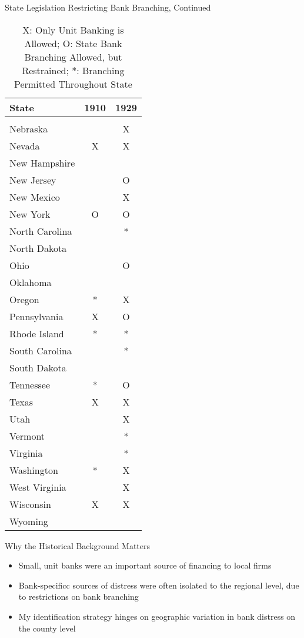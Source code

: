 \documentclass[11pt]{beamer}
\begin{document}
\begin{frame}{State Legislation Restricting Bank Branching, Continued}
\begin{table}  \tiny{
\begin{tabular}{lcc}
State &1910 & 1929 \\  
\hline \hline \\
Nebraska & & X \\
Nevada & X & X \\
New Hampshire &  & \\
New Jersey & & O \\
New Mexico & & X \\
New York & O & O \\
North Carolina & & * \\
North Dakota & & \\
Ohio & & O \\
Oklahoma & & \\
Oregon & * & X \\
Pennsylvania & X & O \\
Rhode Island & * & * \\
South Carolina & & * \\
South Dakota & & \\
Tennessee & * & O \\
Texas & X & X \\
Utah & & X \\
Vermont & & * \\
Virginia & & * \\
Washington & * & X \\
West Virginia & & X \\
Wisconsin & X & X \\
Wyoming & & \\
\hline                                                                                                                             

\end{tabular}
}
\caption{\tiny{X: Only Unit Banking is Allowed; O: State Bank Branching Allowed, but Restrained; *: Branching Permitted Throughout State}}
\end{table}
\end{frame}



\begin{frame}{Why the Historical Background Matters}
\begin{itemize}
\item Small, unit banks were an important source of financing to local firms
\item Bank-specificc sources of distress were often isolated to the regional level, due to restrictions on bank branching
\item My identification strategy hinges on geographic variation in bank distress on the county level
\end{itemize}
\end{frame}
\end{document}
